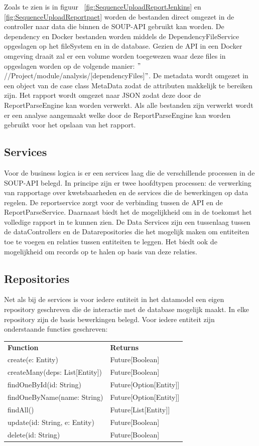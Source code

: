 Zoals te zien is in figuur ~\ref{fig:SequenceUploadReportJenkins} en \ref{fig:SequenceUploadReportpaet} worden de bestanden direct omgezet in de controller naar data die binnen de SOUP-API gebruikt kan worden. De dependency en Docker bestanden worden middels de DependencyFileService opgeslagen op het fileSystem en in de database. Gezien de API in een Docker omgeving draait zal er een volume worden toegewezen waar deze files in opgeslagen worden op de volgende manier: $"$//Project/module/analysis/[dependencyFiles]$"$. De metadata wordt omgezet in een object van de case class MetaData zodat de attributen makkelijk te bereiken zijn. Het rapport wordt omgezet naar JSON zodat deze door de ReportParseEngine kan worden verwerkt. Als alle bestanden zijn verwerkt wordt er een analyse aangemaakt welke door de ReportParseEngine kan worden gebruikt voor het opslaan van het rapport.

\subsection{Services}\label{subsec:Services}
Voor de business logica is er een services laag die de verschillende processen in de SOUP-API belegd. In principe zijn er twee hoofdtypen processen: de verwerking van rapportage over kwetsbaarheden en de services die de bewerkingen op data regelen.
De reportservice zorgt voor de verbinding tussen de API en de ReportParseService. Daarnaast biedt het de mogelijkheid om in de toekomst het volledige rapport in te kunnen zien.
De Data Services zijn een tussenlaag tussen de dataControllers en de Datarepositories die het mogelijk maken om entiteiten toe te voegen en relaties tussen entiteiten te leggen. Het biedt ook de mogelijkheid om records op te halen op basis van deze relaties.

\subsection{Repositories}\label{subsec:repositories}
Net als bij de services is voor iedere entiteit in het datamodel een eigen repository geschreven die de interactie met de database mogelijk maakt. In elke repository zijn de basis bewerkingen belegd. Voor iedere entiteit zijn onderstaande functies geschreven:

\begin{tabular}{ll}
    \textbf{Function} & \textbf{Returns}\\
    create(e: Entity) & Future[Boolean] \\
    createMany(deps: List[Entity])& Future[Boolean]\\
    findOneById(id: String) & Future[Option[Entity]]\\
    findOneByName(name: String) & Future[Option[Entity]]\\
    findAll() & Future[List[Entity]] \\
    update(id: String, e: Entity) & Future[Boolean]\\
    delete(id: String) & Future[Boolean] \\
\end{tabular} \\

